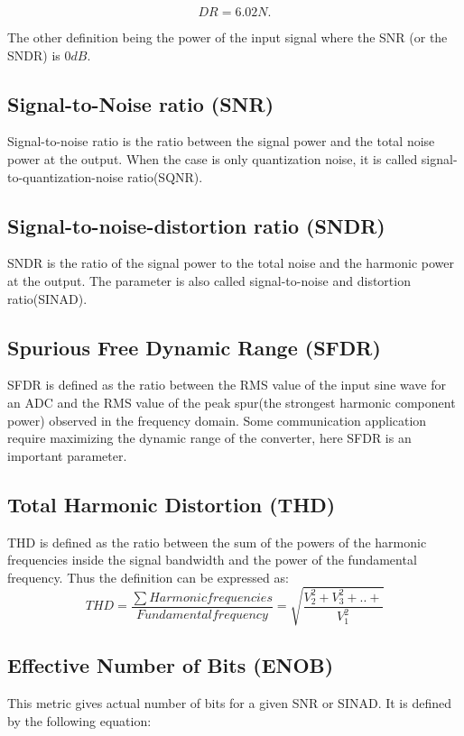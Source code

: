 \begin{equation}
    DR = 6.02N.
\end{equation}

The other definition being the power of the input signal where the SNR (or the SNDR) is $0dB$. 

\subsection{Signal-to-Noise ratio (SNR)}
Signal-to-noise ratio is the ratio between the signal power and the total noise power at the output. When the case is only quantization noise, it is called signal-to-quantization-noise ratio(SQNR). 

\subsection{Signal-to-noise-distortion ratio (SNDR)}
SNDR is the ratio of the signal power to the total noise and the harmonic power at the output. The parameter is also called signal-to-noise and distortion ratio(SINAD).  

\subsection{Spurious Free Dynamic Range (SFDR)}
SFDR is defined as the ratio between the RMS value of the input sine wave for an ADC and the RMS value of the peak spur(the strongest harmonic component power) observed in the frequency domain. Some communication application require maximizing the dynamic range of the converter, here SFDR is an important parameter. 

\subsection{Total Harmonic Distortion (THD)}
THD is defined  as the ratio between the sum of the powers of the harmonic frequencies inside the signal bandwidth and the power of the fundamental frequency. Thus the definition can be expressed as:
\begin{equation}
    THD = \frac{\sum Harmonic frequencies}{Fundamental frequency} = \sqrt{\frac{V_2^2 + V_3^2 + .. +}{V_1^2}}
\end{equation}

\subsection{Effective Number of Bits (ENOB)}
This metric gives actual number of bits for a given SNR or SINAD. It is defined by the following equation:

